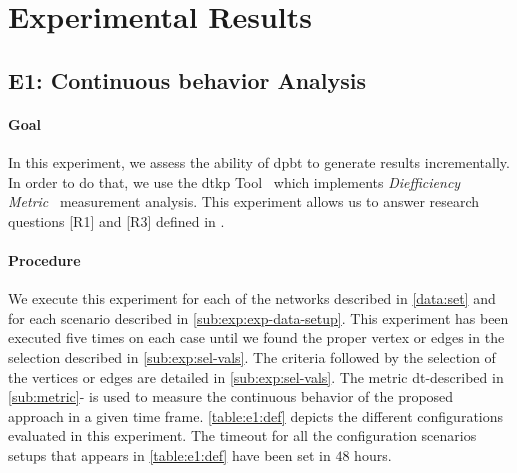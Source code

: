 \section{Experimental Results}\label{sec:exp:observed-results}
\subsection{E1: Continuous behavior Analysis}\label{sub:sec:exp-1} 
\paragraph{Goal} In this experiment, we assess the ability of \acrshort{dpbt} to generate results incrementally.
In order to do that, we use the \acrlong{dtkp} Tool~\cite{diefpy} which implements \emph{Diefficiency Metric}~\cite{diefpaper} measurement analysis.
This experiment allows us to answer research questions [R1] and [R3] defined in . 

\paragraph{Procedure} We execute this experiment for each of the networks described in \autoref{data:set} and for each scenario described in \autoref{sub:exp:exp-data-setup}.
This experiment has been executed five times on each case until we found the proper vertex or edges in the selection described in \autoref{sub:exp:sel-vals}. The criteria followed by the selection of the vertices or edges are detailed in \autoref{sub:exp:sel-vals}.
The metric  \acrlong{dt}-described in \autoref{sub:metric}- is used to measure the continuous behavior of the proposed approach in a given time frame.
\autoref{table:e1:def} depicts the different configurations evaluated in this experiment. The timeout for all the configuration scenarios setups that appears in \autoref{table:e1:def} have been set in $48$ hours.

